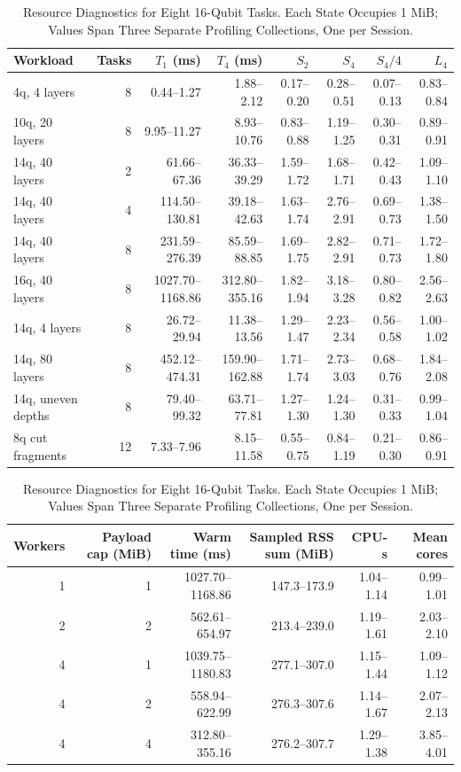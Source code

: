 \begin{table}[!t]
\caption{All Local Multiprocessing Workloads: Warm Timings, Paired Speedups, and Ten-Call
Setup-Charged Speedups. Ranges Span Three Sessions.}
\label{tab:local_parallel_full}
\centering
\footnotesize
\setlength{\tabcolsep}{4pt}
\begin{tabular}{lrrrrrrr}
\toprule
Workload & Tasks & $T_1$ (ms) & $T_4$ (ms) & $S_2$ & $S_4$ & $S_4/4$ & $L_4$ \\
\midrule
4q, 4 layers & 8 & 0.44--1.27 & 1.88--2.12 & 0.17--0.20 & 0.28--0.51 & 0.07--0.13 & 0.83--0.84 \\
10q, 20 layers & 8 & 9.95--11.27 & 8.93--10.76 & 0.83--0.88 & 1.19--1.25 & 0.30--0.31 & 0.89--0.91 \\
14q, 40 layers & 2 & 61.66--67.36 & 36.33--39.29 & 1.59--1.72 & 1.68--1.71 & 0.42--0.43 & 1.09--1.10 \\
14q, 40 layers & 4 & 114.50--130.81 & 39.18--42.63 & 1.63--1.74 & 2.76--2.91 & 0.69--0.73 & 1.38--1.50 \\
14q, 40 layers & 8 & 231.59--276.39 & 85.59--88.85 & 1.69--1.75 & 2.82--2.91 & 0.71--0.73 & 1.72--1.80 \\
16q, 40 layers & 8 & 1027.70--1168.86 & 312.80--355.16 & 1.82--1.94 & 3.18--3.28 & 0.80--0.82 & 2.56--2.63 \\
14q, 4 layers & 8 & 26.72--29.94 & 11.38--13.56 & 1.29--1.47 & 2.23--2.34 & 0.56--0.58 & 1.00--1.02 \\
14q, 80 layers & 8 & 452.12--474.31 & 159.90--162.88 & 1.71--1.74 & 2.73--3.03 & 0.68--0.76 & 1.84--2.08 \\
14q, uneven depths & 8 & 79.40--99.32 & 63.71--77.81 & 1.27--1.30 & 1.24--1.30 & 0.31--0.33 & 0.99--1.04 \\
8q cut fragments & 12 & 7.33--7.96 & 8.15--11.58 & 0.55--0.75 & 0.84--1.19 & 0.21--0.30 & 0.86--0.91 \\
\bottomrule
\end{tabular}
\par\vspace{8pt}
\caption{Resource Diagnostics for Eight 16-Qubit Tasks. Each State Occupies 1 MiB; Values Span
Three Separate Profiling Collections, One per Session.}
\label{tab:local_parallel_resources}
\centering
\footnotesize
\setlength{\tabcolsep}{5pt}
\begin{tabular}{rrrrrr}
\toprule
Workers & Payload cap (MiB) & Warm time (ms) & Sampled RSS sum (MiB) & CPU-s & Mean cores \\
\midrule
1 & 1 & 1027.70--1168.86 & 147.3--173.9 & 1.04--1.14 & 0.99--1.01 \\
2 & 2 & 562.61--654.97 & 213.4--239.0 & 1.19--1.61 & 2.03--2.10 \\
4 & 1 & 1039.75--1180.83 & 277.1--307.0 & 1.15--1.44 & 1.09--1.12 \\
4 & 2 & 558.94--622.99 & 276.3--307.6 & 1.14--1.67 & 2.07--2.13 \\
4 & 4 & 312.80--355.16 & 276.2--307.7 & 1.29--1.38 & 3.85--4.01 \\
\bottomrule
\end{tabular}
\end{table}

